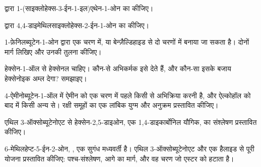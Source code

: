 \begin{exercise}[$\star\star$]\label{exo:b2:retrosynthesis:6}
 द्वारा 1-(साइक्लोहेक्स-3-ईन-1-इल)एथेन-1-ओन का  कीजिए।
\end{exercise}

\begin{exercise}[$\star\star$]\label{exo:b2:retrosynthesis:7}
 द्वारा 4,4-डाइमेथिलसाइक्लोहेक्स-2-ईन-1-ओन का  कीजिए।
\end{exercise}

\begin{exercise}[$\star\star$]\label{exo:b2:retrosynthesis:8}
1-फ़ेनिलब्यूटेन-1-ओन  द्वारा एक चरण में, या बेन्ज़ैल्डिहाइड से दो चरणों में बनाया जा सकता है।
दोनों मार्ग लिखिए और उनकी तुलना कीजिए।
\end{exercise}

\begin{exercise}[$\star\star$]\label{exo:b2:retrosynthesis:9}
हेक्सेन-1-ऑल से हेक्सेनल चाहिए। कौन-से अभिकर्मक इसे देते हैं, और कौन-सा इसके बजाय हेक्सेनोइक अम्ल
देगा? समझाइए।
\end{exercise}

\begin{exercise}[$\star\star\star$]\label{exo:b2:retrosynthesis:10}
4-ऐमीनोब्यूटेन-1-ऑल में ऐमीन को एक चरण में पहले किसी  से अभिक्रिया करनी है, और ऐल्कोहॉल को
बाद में किसी अन्य से। रक्षी समूहों का एक लांबिक युग्म और अनुक्रम प्रस्तावित कीजिए।
\end{exercise}

\begin{exercise}[$\star\star\star$]\label{exo:b2:retrosynthesis:11}
एथिल 3-ऑक्सोब्यूटेनोएट से हेक्सेन-2,5-डाइओन, एक 1,4-डाइकार्बोनिल यौगिक, का संश्लेषण प्रस्तावित कीजिए।
\end{exercise}

\begin{exercise}[$\star\star\star$]\label{exo:b2:retrosynthesis:12}
6-मेथिलहेप्ट-5-ईन-2-ओन, , एक सुगंध मध्यवर्ती है। एथिल 3-ऑक्सोब्यूटेनोएट और
एक हैलाइड से पूरी योजना प्रस्तावित कीजिए: पश्च-संश्लेषण, आगे का मार्ग, और वह चरण जो
एस्टर को हटाता है।
\end{exercise}

